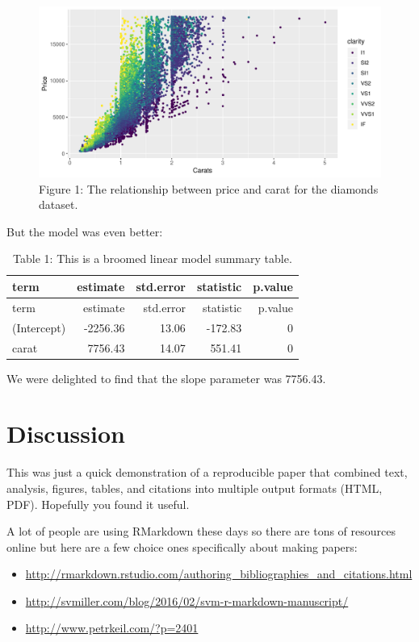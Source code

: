\documentclass[]{article}
\providecommand{\tightlist}{%
  \setlength{\itemsep}{0pt}\setlength{\parskip}{0pt}}
\begin{document}
\begin{figure}

{\centering \includegraphics{paper-example_files/figure-latex/pricevscarat-1} 

}

\caption{Figure  1: The relationship between price and carat for the diamonds dataset.}\label{fig:pricevscarat}
\end{figure}

But the model was even better:

\begin{longtable}[]{@{}lrrrr@{}}
\caption{Table 1: This is a broomed linear model summary
table.}\tabularnewline
\toprule
term & estimate & std.error & statistic & p.value\tabularnewline
\midrule
\endfirsthead
\toprule
term & estimate & std.error & statistic & p.value\tabularnewline
\midrule
\endhead
(Intercept) & -2256.36 & 13.06 & -172.83 & 0\tabularnewline
carat & 7756.43 & 14.07 & 551.41 & 0\tabularnewline
\bottomrule
\end{longtable}

We were delighted to find that the slope parameter was 7756.43.

\section{Discussion}\label{discussion}

This was just a quick demonstration of a reproducible paper that
combined text, analysis, figures, tables, and citations into multiple
output formats (HTML, PDF). Hopefully you found it useful.

A lot of people are using RMarkdown these days so there are tons of
resources online but here are a few choice ones specifically about
making papers:

\begin{itemize}
\tightlist
\item
  \url{http://rmarkdown.rstudio.com/authoring_bibliographies_and_citations.html}
\item
  \url{http://svmiller.com/blog/2016/02/svm-r-markdown-manuscript/}
\item
  \url{http://www.petrkeil.com/?p=2401}
\end{itemize}
\end{document}

